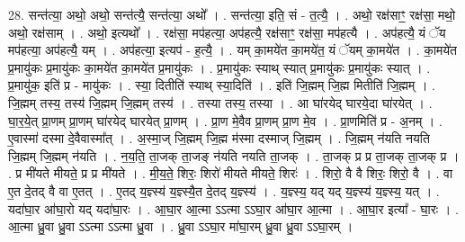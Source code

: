 \documentclass[17pt]{extarticle}
\begin{document}
28. सन्त॑त्या॒ अथो॒ अथो॒ सन्त॑त्यै॒ सन्त॑त्या॒ अथो᳚ । . सन्त॑त्या॒ इति॒ सं - त॒त्यै॒ । . अथो॒ रक्ष॑साꣳ॒॒ रक्ष॑सा॒ मथो॒ अथो॒ रक्ष॑साम् । . अथो॒ इत्यथो᳚ । . रक्ष॑सा॒ मप॑हत्या॒ अप॑हत्यै॒ रक्ष॑साꣳ॒॒ रक्ष॑सा॒ मप॑हत्यै । . अप॑हत्यै॒ यं ॅय मप॑हत्या॒ अप॑हत्यै॒ यम् । . अप॑हत्या॒ इत्यप॑ - ह॒त्यै॒ । . यम् का॒मये॑त का॒मये॑त॒ यं ॅयम् का॒मये॑त । . का॒मये॑त प्र॒मायु॑कः प्र॒मायु॑कः का॒मये॑त का॒मये॑त प्र॒मायु॑कः । . प्र॒मायु॑कः स्याथ् स्यात् प्र॒मायु॑कः प्र॒मायु॑कः स्यात् । . प्र॒मायु॑क॒ इति॑ प्र - मायु॑कः । . स्या॒ दितीति॑ स्याथ् स्या॒दिति॑ । . इति॑ जि॒ह्मम् जि॒ह्म मितीति॑ जि॒ह्मम् । . जि॒ह्मम् तस्य॒ तस्य॑ जि॒ह्मम् जि॒ह्मम् तस्य॑ । . तस्या तस्य॒ तस्या । . आ घा॑रयेद् घारये॒दा घा॑रयेत् । . घा॒र॒ये॒त् प्रा॒णम् प्रा॒णम् घा॑रयेद् घारयेत् प्रा॒णम् । . प्रा॒ण मे॒वैव प्रा॒णम् प्रा॒ण मे॒व । . प्रा॒णमिति॑ प्र - अ॒नम् । . ए॒वास्मा॑ दस्मा दे॒वैवास्मा᳚त् । . अ॒स्मा॒ज् जि॒ह्मम् जि॒ह्म म॑स्मा दस्माज् जि॒ह्मम् । . जि॒ह्मम् न॑यति नयति जि॒ह्मम् जि॒ह्मम् न॑यति । . न॒य॒ति॒ ता॒जक् ता॒जङ् न॑यति नयति ता॒जक् । . ता॒जक् प्र प्र ता॒जक् ता॒जक् प्र । . प्र मी॑यते मीयते॒ प्र प्र मी॑यते । . मी॒य॒ते॒ शिरः॒ शिरो॑ मीयते मीयते॒ शिरः॑ । . शिरो॒ वै वै शिरः॒ शिरो॒ वै । . वा ए॒त दे॒तद् वै वा ए॒तत् । . ए॒तद् य॒ज्ञ्स्य॑ य॒ज्ञ्स्यै॒त दे॒तद् य॒ज्ञ्स्य॑ । . य॒ज्ञ्स्य॒ यद् यद् य॒ज्ञ्स्य॑ य॒ज्ञ्स्य॒ यत् । . यदा॑घा॒र आ॑घा॒रो यद् यदा॑घा॒रः । . आ॒घा॒र आ॒त्मा ऽऽत्मा ऽऽघा॒र आ॑घा॒र आ॒त्मा । . आ॒घा॒र इत्या᳚ - घा॒रः । . आ॒त्मा ध्रु॒वा ध्रु॒वा ऽऽत्मा ऽऽत्मा ध्रु॒वा । . ध्रु॒वा ऽऽघा॒र मा॑घा॒रम् ध्रु॒वा ध्रु॒वा ऽऽघा॒रम् । \newline
\end{document}
